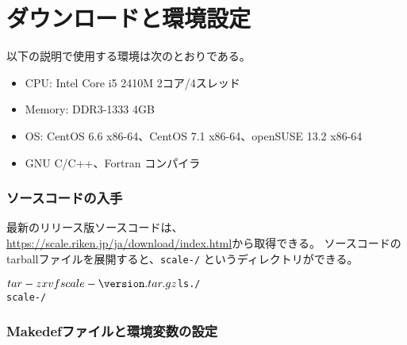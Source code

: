 
\section{ダウンロードと環境設定} \label{sec:download}

以下の説明で使用する環境は次のとおりである。
\begin{itemize}
\item CPU: Intel Core i5 2410M 2コア/4スレッド
\item Memory: DDR3-1333 4GB
\item OS: CentOS 6.6 x86-64、CentOS 7.1 x86-64、openSUSE 13.2 x86-64
\item GNU C/C++、Fortran コンパイラ
\end{itemize}

\subsubsection{ソースコードの入手} \label{subsec:get_source_code}
最新のリリース版ソースコードは、\url{https://scale.riken.jp/ja/download/index.html}から取得できる。
ソースコードのtarballファイルを展開すると、\texttt{scale-{\version}/} というディレクトリができる。
\begin{alltt}
 $ tar -zxvf scale-{\version}.tar.gz
 $ ls ./
    scale-{\version}/
\end{alltt}

\subsubsection{Makedefファイルと環境変数の設定} \label{subsec:environment}

